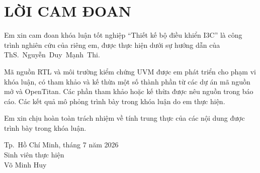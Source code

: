 \chapter*{LỜI CAM ĐOAN}

Em xin cam đoan khóa luận tốt nghiệp ``Thiết kế bộ điều khiển I3C'' là công trình
nghiên cứu của riêng em, được thực hiện dưới sự hướng dẫn của ThS.~Nguyễn~Duy~Mạnh~Thi.

Mã nguồn RTL và môi trường kiểm chứng UVM được em phát triển cho phạm vi khóa luận, có tham khảo
và kế thừa một số thành phần từ các dự án mã nguồn mở \CHIPSAlliance{} \IThreeCCore{} và
OpenTitan. Các phần tham khảo hoặc kế thừa được nêu nguồn trong báo cáo. Các kết quả mô phỏng
trình bày trong khóa luận do em thực hiện.

Em xin chịu hoàn toàn trách nhiệm về tính trung thực của các nội dung được trình bày trong khóa luận.

\vspace{1cm}
\begin{flushright}
Tp.~Hồ Chí Minh, tháng 7 năm 2026\\
Sinh viên thực hiện\\[1.5cm]
Võ Minh Huy
\end{flushright}
